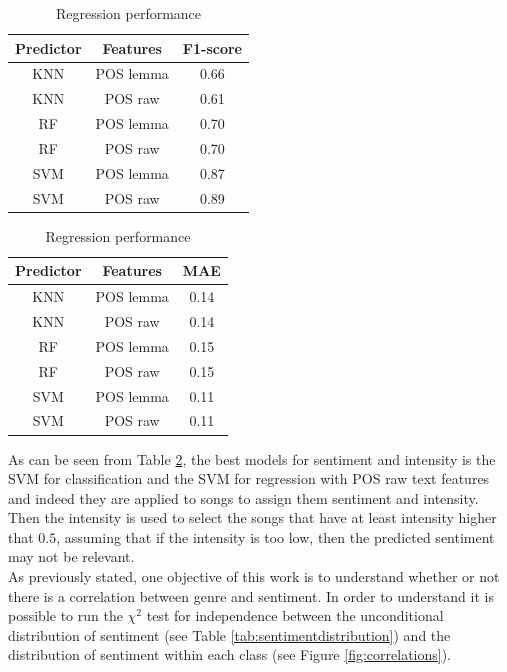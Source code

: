 \documentclass[runningheads]{llncs}
\begin{document}
\begin{table}[H]
    \caption{Performance of predictors}
        \label{tab:models}
    \begin{subtable}{.5\linewidth}
      \centering
        \caption{Classification performance}
        \begin{tabular}{||c |c |c||} 
 \hline
 Predictor & Features & F1-score \\ [0.5ex] 
 \hline\hline
 KNN & POS lemma & 0.66  \\ 
 \hline
 KNN & POS raw & 0.61  \\ 
 \hline
 RF & POS lemma & 0.70  \\ 
 \hline
 RF & POS raw & 0.70  \\ 
 \hline
 SVM & POS lemma & 0.87  \\ 
 \hline
 SVM & POS raw & 0.89  \\ 
 \hline
\end{tabular}
    \end{subtable}%
    \begin{subtable}{.5\linewidth}
      \centering
        \caption{Regression performance}
       \begin{tabular}{||c |c |c||} 
 \hline
 Predictor & Features & MAE \\ [0.5ex] 
 \hline\hline
 KNN & POS lemma & 0.14  \\ 
 \hline
 KNN & POS raw & 0.14  \\ 
 \hline
 RF & POS lemma & 0.15  \\ 
 \hline
 RF & POS raw & 0.15  \\ 
 \hline
 SVM & POS lemma & 0.11  \\ 
 \hline
 SVM & POS raw & 0.11  \\ 
 \hline
\end{tabular}
    \end{subtable} 
\end{table}

As can be seen from Table \ref{tab:models}, the best models for sentiment and intensity is the SVM for classification and the SVM for regression with POS raw text features and indeed they are applied to songs to assign them sentiment and intensity. Then the intensity is used to select the songs that have at least intensity higher that $0.5$, assuming that if the intensity is too low, then the predicted sentiment may not be relevant. \\

As previously stated, one objective of this work is to understand whether or not there is a correlation between genre and sentiment. In order to understand it is possible to run the $\chi^2$ test for independence between the unconditional distribution of sentiment (see Table \ref{tab:sentimentdistribution}) and the distribution of sentiment within each class (see Figure \ref{fig:correlations}). 
\end{document}
